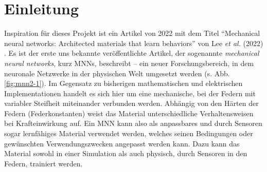 \documentclass[10pt]{scrartcl}
\newcommand*{\eng}[1]{\textit{#1}}
\newcommand*{\feng}[1]{\eng{#1}}
\newcommand{\lee}{Lee {\itshape et al.} (2022)}
\begin{document}



\pagestyle{fancy}
\fancyhead{}
\fancyhead[L]{\rightmark}

\newpage

\pagestyle{fancy}
\fancyhead{}
\fancyhead[L]{\rightmark}

\section{Einleitung}

Inspiration für dieses Projekt ist ein Artikel von 2022 mit dem Titel \enquote{Mechanical neural networks: Architected materials that learn behaviors} von \lee{} \cite{Lee2022}.
%
Es ist der erste uns bekannte veröffentlichte Artikel, der sogenannte \feng{mechanical neural networks}, kurz MNNs, beschreibt -- ein neuer Forschungsbereich, in dem neuronale Netzwerke in der physischen Welt umgesetzt werden (s. Abb. \ref{fig:mnn2-1}).
Im Gegensatz zu bisherigen mathematischen und elektrischen Implementationen handelt es sich hier um eine mechanische, bei der Federn mit variabler Steifheit miteinander verbunden werden.
Abhängig von den Härten der Federn (Federkonstanten) weist das Material unterschiedliche Verhaltensweisen bei Krafteinwirkung auf. 
%
Ein MNN kann also als anpassbares und durch Sensoren sogar lernfähiges Material verwendet werden, welches seinen Bedingungen oder gewünschten Verwendungszwecken angepasst werden kann.
Dazu kann das Material sowohl in einer Simulation als auch physisch, durch Sensoren in den Federn, trainiert werden.
\end{document}
